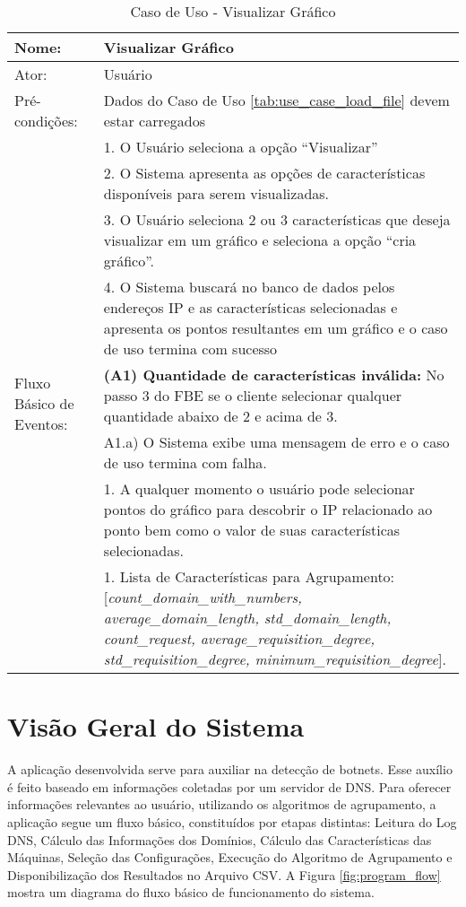 \begin{table}[]
\centering
\caption{Caso de Uso - Visualizar Gráfico}
\label{tab:use_case_visualize}
\begin{tabular}{|lp{10cm}|}
\hline
Nome: & Visualizar Gráfico  \\ \hline
Ator: & Usuário   \\ \hline
Pré-condições: & Dados do Caso de Uso \ref{tab:use_case_load_file} devem estar carregados  \\ \hline
\multirow{10}{*}{Fluxo Básico de Eventos:} & 1. O Usuário seleciona a opção ``Visualizar''  \\
 & 2. O Sistema apresenta as opções de características disponíveis para serem visualizadas. \\
 & 3. O Usuário seleciona 2 ou 3 características que deseja visualizar em um gráfico e seleciona a opção ``cria gráfico''. \\
 & 4. O Sistema buscará no banco de dados pelos endereços IP e as características selecionadas e apresenta os pontos resultantes em um gráfico e o caso de uso termina com sucesso  \\
 \hline
\multirow{5}{*}{Fluxo Alternativo de Eventos:} & \textbf{(A1) Quantidade de características inválida:} No passo 3 do FBE se o cliente selecionar qualquer quantidade abaixo de 2 e acima de 3.\\
 & A1.a) O Sistema exibe uma mensagem de erro e o caso de uso termina com falha.\\
 \hline
\multirow{3}{*}{Pós-Condições:} & 1. A qualquer momento o usuário pode selecionar pontos do gráfico para descobrir o IP relacionado ao ponto bem como o valor de suas características selecionadas. \\
\hline
\multirow{5}{*}{Outras Informações:} & 1. Lista de Características para Agrupamento: [\textit{count\_domain\_with\_numbers, average\_domain\_length, std\_domain\_length, count\_request, average\_requisition\_degree, std\_requisition\_degree, minimum\_requisition\_degree}].  \\
\hline 
\end{tabular}
\end{table}

\section{Visão Geral do Sistema}
A aplicação desenvolvida serve para auxiliar na detecção de botnets. Esse auxílio é feito baseado em informações coletadas por um servidor de DNS. Para oferecer informações relevantes ao usuário, utilizando os algoritmos de agrupamento, a aplicação segue um fluxo básico, constituídos por etapas distintas: Leitura do Log DNS, Cálculo das Informações dos Domínios, Cálculo das Características das Máquinas, Seleção das Configurações, Execução do Algoritmo de Agrupamento e Disponibilização dos Resultados no Arquivo CSV. A Figura \ref{fig:program_flow} mostra um diagrama do fluxo básico de funcionamento do sistema.

